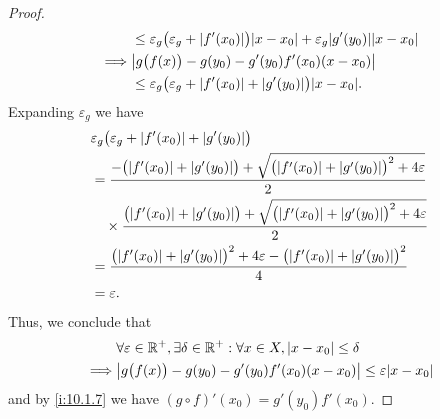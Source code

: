 \begin{proof}
\begin{align*}
             & \leq \varepsilon_g \big(\varepsilon_g + \abs{f'(x_0)}\big) \abs{x - x_0} + \varepsilon_g \abs{g'(y_0)} \abs{x - x_0} \\
    \implies & \abs{g\big(f(x)\big) - g(y_0) - g'(y_0) f'(x_0) (x - x_0)}                                                           \\
             & \leq \varepsilon_g \big(\varepsilon_g + \abs{f'(x_0)} + \abs{g'(y_0)}\big) \abs{x - x_0}.
  \end{align*}
  Expanding \(\varepsilon_g\) we have
  \begin{align*}
     & \varepsilon_g \big(\varepsilon_g + \abs{f'(x_0)} + \abs{g'(y_0)}\big)                                                              \\
     & = \dfrac{-\big(\abs{f'(x_0)} + \abs{g'(y_0)}\big) + \sqrt{\big(\abs{f'(x_0)} + \abs{g'(y_0)}\big)^2 + 4 \varepsilon}}{2}           \\
     & \quad \times \dfrac{\big(\abs{f'(x_0)} + \abs{g'(y_0)}\big) + \sqrt{\big(\abs{f'(x_0)} + \abs{g'(y_0)}\big)^2 + 4 \varepsilon}}{2} \\
     & = \dfrac{\big(\abs{f'(x_0)} + \abs{g'(y_0)}\big)^2 + 4 \varepsilon - \big(\abs{f'(x_0)} + \abs{g'(y_0)}\big)^2}{4}                 \\
     & = \varepsilon.
  \end{align*}
  Thus, we conclude that
  \begin{align*}
             & \forall \varepsilon \in \R^+, \exists \delta \in \R^+ : \forall x \in X, \abs{x - x_0} \leq \delta \\
    \implies & \abs{g\big(f(x)\big) - g(y_0) - g'(y_0) f'(x_0) (x - x_0)} \leq \varepsilon \abs{x - x_0}
  \end{align*}
  and by \cref{i:10.1.7} we have \((g \circ f)'(x_0) = g'(y_0) f'(x_0)\).
\end{proof}

